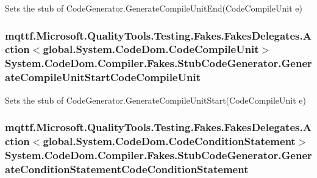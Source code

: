 Sets the stub of Code\-Generator.\-Generate\-Compile\-Unit\-End(\-Code\-Compile\-Unit e)

\hypertarget{class_system_1_1_code_dom_1_1_compiler_1_1_fakes_1_1_stub_code_generator_a33db2609db30b596114ca86b4c2c912a}{
\subsubsection[{Generate\-Compile\-Unit\-Start\-Code\-Compile\-Unit}]{\setlength{\rightskip}{0pt plus 5cm}mqttf.\-Microsoft.\-Quality\-Tools.\-Testing.\-Fakes.\-Fakes\-Delegates.\-Action$<$global.\-System.\-Code\-Dom.\-Code\-Compile\-Unit$>$ System.\-Code\-Dom.\-Compiler.\-Fakes.\-Stub\-Code\-Generator.\-Generate\-Compile\-Unit\-Start\-Code\-Compile\-Unit}}\label{class_system_1_1_code_dom_1_1_compiler_1_1_fakes_1_1_stub_code_generator_a33db2609db30b596114ca86b4c2c912a}


Sets the stub of Code\-Generator.\-Generate\-Compile\-Unit\-Start(\-Code\-Compile\-Unit e)

\hypertarget{class_system_1_1_code_dom_1_1_compiler_1_1_fakes_1_1_stub_code_generator_a0f6ded08cd18c13af2ac9938925878f8}{
\subsubsection[{Generate\-Condition\-Statement\-Code\-Condition\-Statement}]{\setlength{\rightskip}{0pt plus 5cm}mqttf.\-Microsoft.\-Quality\-Tools.\-Testing.\-Fakes.\-Fakes\-Delegates.\-Action$<$global.\-System.\-Code\-Dom.\-Code\-Condition\-Statement$>$ System.\-Code\-Dom.\-Compiler.\-Fakes.\-Stub\-Code\-Generator.\-Generate\-Condition\-Statement\-Code\-Condition\-Statement}}\label{class_system_1_1_code_dom_1_1_compiler_1_1_fakes_1_1_stub_code_generator_a0f6ded08cd18c13af2ac9938925878f8}



